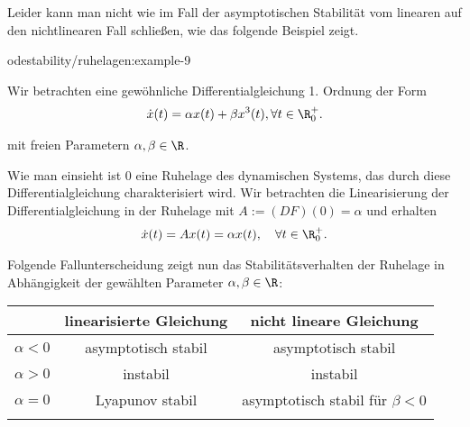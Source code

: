 \documentclass[letterpaper,10pt,german]{jupyterBook}
\begin{document}
\par
Leider kann man nicht wie im Fall der asymptotischen Stabilität vom linearen auf den nichtlinearen Fall schließen, wie das folgende Beispiel zeigt.
\begin{example}{}{odestability/ruhelagen:example-9}



\par
Wir betrachten eine gewöhnliche Differentialgleichung 1. Ordnung der Form
\begin{align*}
\dot{x}(t) = \alpha x(t) + \beta x^3(t), \forall t \in \R^+_0.
\end{align*}
\par
mit freien Parametern \(\alpha, \beta \in \R\).

\par
Wie man einsieht ist \(0\) eine Ruhelage des dynamischen Systems, das durch diese Differentialgleichung charakterisiert wird.
Wir betrachten die Linearisierung der Differentialgleichung in der Ruhelage mit \(A := (DF)(0) = \alpha\) und erhalten
\begin{align*}
\dot{x}(t) = A x(t) = \alpha x(t), \quad \forall t \in \R^+_0.
\end{align*}
\par
Folgende Fallunterscheidung zeigt nun das Stabilitätsverhalten der Ruhelage in Abhängigkeit der gewählten Parameter \(\alpha, \beta \in \R\):


\begin{center}
\centering
\begin{tabularx}{\linewidth}[{\linewidth}]{|c|c|c|}\hline

\par

& 
\par
linearisierte Gleichung
& 
\par
nicht lineare Gleichung
\\
\hline
\par
\(\alpha<0\)
&
\par
asymptotisch stabil
&
\par
asymptotisch stabil
\\
\hline
\par
\(\alpha>0\)
&
\par
instabil
&
\par
instabil
\\
\hline
\par
\(\alpha=0\)
&
\par
Lyapunov stabil
&
\par
asymptotisch stabil für \(\beta<0\)
\\
\hline
\par


\end{tabularx}
\end{center}
\end{example}
\end{document}
